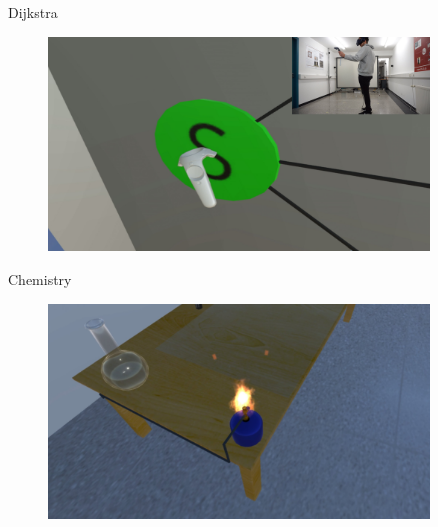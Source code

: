 \documentclass[final,hyperref={pdfpagelabels=false}]{beamer}
\begin{document}
\begin{frame}[t]
\begin{columns}[t]
\begin{column}{.465\textwidth}
\begin{block}{Dijkstra}
	\begin{figure}
		\centering
		\includegraphics[width=0.95\linewidth]{VSL_Screen_2}

	\end{figure}
\end{block}

\vspace{0.3cm}

\begin{block}{Chemistry}
    \begin{figure}
    	\centering
    	\includegraphics[width=0.95\linewidth]{bunsenbrenner}
    \end{figure}
\end{block}

\end{column} %

\begin{column}{.03\textwidth}\end{column} %

\begin{column}{.465\textwidth} %


\end{column}
\end{columns}
\end{frame}
\end{document}
